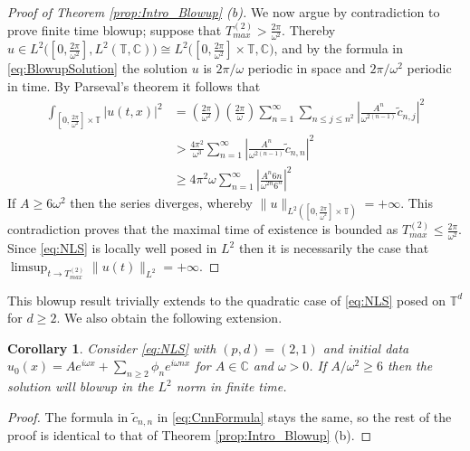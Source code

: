 \documentclass{article}
\newtheorem{corollary}[theorem]{Corollary}
\newcommand{\C}{\mathbb{C}}
\newcommand{\T}{\mathbb{T}}
\begin{document}
\begin{proof}[Proof of Theorem \ref{prop:Intro_Blowup} (b)]
 	  
 We now argue by contradiction to prove finite time blowup; suppose that $ T_{max}^{(2)}  > \frac{2 \pi }{\omega^2}$.  
 Thereby  
 $u \in 
  L^2\big([0,\frac{2 \pi }{\omega^2}] , L^2(  \T , \C)\big)
  \cong 
  L^2\big([0,\frac{2 \pi }{\omega^2}] \times  \T , \C\big) $, and by the formula in \eqref{eq:BlowupSolution} the solution $u$ is $2 \pi / \omega$ periodic in space and $2 \pi / \omega^2$ periodic in time.  
By Parseval's theorem it follows that  
 	\begin{align*}
 		\int_{[0,\frac{2\pi}{\omega^2}]\times \T} |u(t,x)|^2& = 
 		\left(
 		\frac{2 \pi}{\omega^2}
 		\right) 
 		\left(
 		\frac{2 \pi}{\omega}
 		\right) 
 		\sum_{n=1}^{\infty} 
 		\sum_{n \leq j \leq n^2} 
 		\left|
 		\frac{A^n}{\omega^{2(n-1)}}
 		\tilde{c}_{n,j} 
 		\right|^2  \\
 		&>  
 		\frac{4 \pi^2}{\omega^3} 
 		\sum_{n=1}^{\infty}  
 		\left|
 		\frac{A^n}{\omega^{2(n-1)}}
 		\tilde{c}_{n,n} 
 		\right|^2  \\ 		
 		&\geq
 		4\pi^2 \omega 
 		\sum_{n=1}^\infty 
 		\left|
 		\frac{A^n 6n}{\omega^{2n} 6^n}
 		\right|^2
 	\end{align*}
 	If $A \geq  6\omega^2$ then the series diverges, whereby $\| u \|_{L^2([0,\frac{2 \pi }{\omega^2}] \times \T )} = + \infty$. 
 	This  contradiction proves that the maximal time of existence is bounded as  $  T_{max}^{(2)}  \leq   \frac{2\pi}{\omega^2}$.  
 	Since \eqref{eq:NLS} is locally well posed in $L^2$ then it is necessarily the case that $\limsup_{t \to  T_{max}^{(2)} } \| u(t)\|_{L^2} = + \infty$.
 \end{proof}

This blowup result trivially extends to the quadratic case of \eqref{eq:NLS} posed on $ \T^d$ for $ d \geq 2$.  
We also obtain the following extension. 
 
 \begin{corollary} \label{prop:GeneralBlowup}
 	Consider     \eqref{eq:NLS}  with $(p,d)=(2,1)$ and  	   initial data $u_0(x) =   A e^{ i \omega  x} + \sum_{n \geq 2} \phi_n e^{i \omega n x}$ for $A \in \C$ and $ \omega >0$.   
 	If $ A/\omega^2 \geq  6$ then the solution will   blowup in the $L^2$ norm in finite time. 
 \end{corollary}
 \begin{proof}
 	The formula in $ \tilde{c}_{n,n}$ in \eqref{eq:CnnFormula} stays the same, so the rest of the proof is identical to that of Theorem \ref{prop:Intro_Blowup} (b).
 \end{proof}
\end{document}
